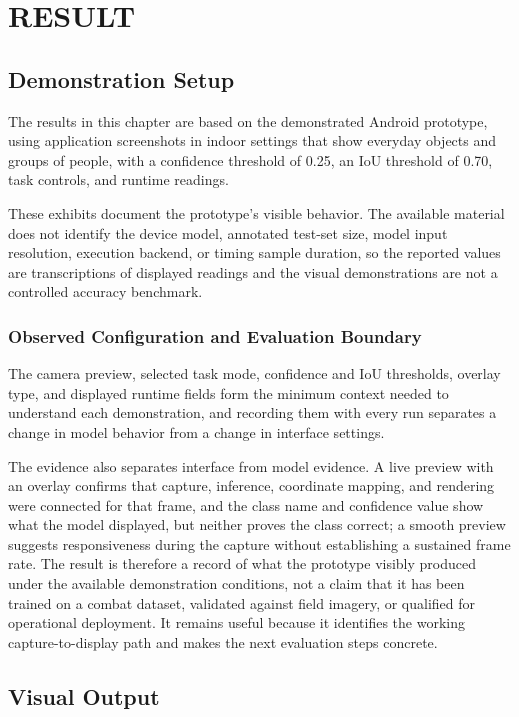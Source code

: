 \chapter{RESULT}\label{ch:result}

\section{Demonstration Setup}\label{sec:demonstration}
The results in this chapter are based on the demonstrated Android prototype, using application
screenshots in indoor settings that show everyday objects and groups of people, with a confidence
threshold of 0.25, an IoU threshold of 0.70, task controls, and runtime readings.

These exhibits document the prototype's visible behavior. The available material does not identify
the device model, annotated test-set size, model input resolution, execution backend, or timing
sample duration, so the reported values are transcriptions of displayed readings and the visual
demonstrations are not a controlled accuracy benchmark.

\subsection{Observed Configuration and Evaluation Boundary}
The camera preview, selected task mode, confidence and IoU thresholds, overlay type, and displayed
runtime fields form the minimum context needed to understand each demonstration, and recording them
with every run separates a change in model behavior from a change in interface settings.

The evidence also separates interface from model evidence. A live preview with an overlay confirms
that capture, inference, coordinate mapping, and rendering were connected for that frame, and the
class name and confidence value show what the model displayed, but neither proves the class correct;
a smooth preview suggests responsiveness during the capture without establishing a sustained frame
rate. The result is therefore a record of what the prototype visibly produced under the available
demonstration conditions, not a claim that it has been trained on a combat dataset, validated
against field imagery, or qualified for operational deployment. It remains useful because it
identifies the working capture-to-display path and makes the next evaluation steps concrete.

\label{end:demonstration}
\section{Visual Output}\label{sec:visual}

